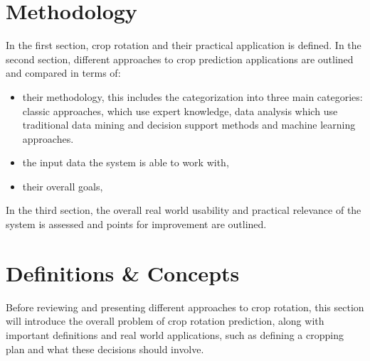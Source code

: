 \documentclass{Academic}
\begin{document}
    \section{Methodology}
    In the first section, crop rotation and their practical application is defined. In the second section, different approaches to crop prediction applications are outlined and compared in terms of:
    \begin{itemize}
        \item their methodology, this includes the categorization into three main categories: classic approaches, which use expert knowledge, data analysis which use traditional data mining and decision support methods and machine learning approaches.
        \item the input data the system is able to work with,
        \item their overall goals,
    \end{itemize}
    In the third section, the overall real world usability and practical relevance of the system is assessed and points for improvement are outlined.

    \section{Definitions \& Concepts} \label{sec:def}
    Before reviewing and presenting different approaches to crop rotation, this section will introduce the overall problem of crop rotation prediction, along with important definitions and real world applications, such as defining a cropping plan and what these decisions should involve.
\end{document}
